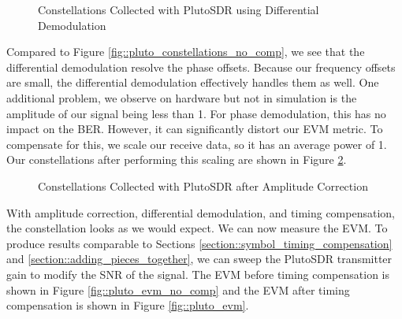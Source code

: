 \documentclass{article}
\begin{document}
\begin{figure}[H]
	\centerline{}
	\caption{Constellations Collected with PlutoSDR using Differential Demodulation}
	\label{fig::pluto_constellations_dbpsk}
\end{figure}

\noindent Compared to Figure \ref{fig::pluto_constellations_no_comp}, we see that the differential demodulation resolve the phase offsets. Because our frequency offsets are small, the differential demodulation effectively handles them as well. One additional problem, we observe on hardware but not in simulation is the amplitude of our signal being less than 1. For phase demodulation, this has no impact on the BER. However, it can significantly distort our EVM metric. To compensate for this, we scale our receive data, so it has an average power of 1. Our constellations after performing this scaling are shown in Figure \ref{fig::pluto_constellations_dbpsk_amp_comp}.

\begin{figure}[H]
	\centerline{}
	\caption{Constellations Collected with PlutoSDR after Amplitude Correction}
	\label{fig::pluto_constellations_dbpsk_amp_comp}
\end{figure}

\noindent With amplitude correction, differential demodulation, and timing compensation, the constellation looks as we would expect. We can now measure the EVM. To produce results comparable to Sections \ref{section::symbol_timing_compensation} and \ref{section::adding_pieces_together}, we can sweep the PlutoSDR transmitter gain to modify the SNR of the signal. The EVM before timing compensation is shown in Figure \ref{fig::pluto_evm_no_comp} and the EVM after timing compensation is shown in Figure \ref{fig::pluto_evm}.
\end{document}
